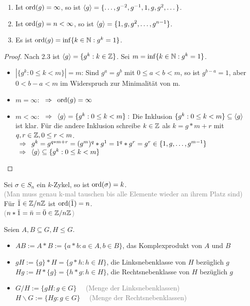\begin{satz}
	\begin{enumerate}
		\item Ist $\operatorname{ord}(g)= \infty$, so ist $\langle g \rangle = \{ \dots , g^{-2}, g^{-1}, 1, g, g^2, \dots \}$.
		\item Ist $\operatorname{ord}(g)=n < \infty$, so ist $\langle g \rangle=\{1,g,g^2, \dots , g^{n-1} \}$.
		\item Es ist $\operatorname{ord}(g) = \inf\{ k \in \mathbb{N} : g^k=1 \}$.
	\end{enumerate}
\end{satz}
\begin{proof}
	Nach 2.3 ist $\langle g \rangle= \{ g^k : k \in \mathbb{Z} \}$. Sei $m=\inf\{k \in \mathbb{N} : g^k = 1 \}$.
	\begin{itemize}
		\item $| \{ g^k : 0 \leq k < m \} | = m$: Sind $g^a=g^b$ mit $0 \leq a < b < m$, so ist $g^{b-a}=1$, aber $0 < b-a < m$ im Widerspruch zur Minimalität von m.
		\item $m=\infty$: $\enspace \Rightarrow \enspace \operatorname{ord}(g)=\infty \quad$ \checkmark
		\item $m<\infty$: $\enspace \Rightarrow \enspace \langle g \rangle = \{ g^k : 0 \leq k < m \}:$ Die Inklusion $\{ g^k :0 \leq k < m \} \subseteq \langle g \rangle$ ist klar. Für die andere Inklusion schreibe $k \in \mathbb{Z}$ als $k=g*m+r$ mit $q,r \in \mathbb{Z}, 0 \leq r < m$. \\ $\enspace \Rightarrow \enspace g^k =g^{q*m+r} = (g^m)^q*g^1 =1^q*g^r =g^r \in \{ 1,g,\dots,g^{m-1} \}$ \\
		$\enspace \Rightarrow \enspace \langle g \rangle \subseteq  \{ g^k : 0\leq k < m \}$
	\end{itemize}
\end{proof}

\begin{bsp}
	Sei $\sigma \in S_n$ ein $k$-Zykel, so ist $\operatorname{ord}(\sigma)=k$. \\ \textcolor{gray}{(Man muss genau k-mal tauschen bis alle Elemente wieder an ihrem Platz sind)} \\
	Für $\bar{1} \in \mathbb{Z} / n \mathbb{Z}$ ist $\operatorname{ord}(\bar{1})=n$. \\ \textcolor{gray}{($n*\bar{1}=\bar{n}=\bar{0} \in \mathbb{Z} / n \mathbb{Z}$)}
\end{bsp}

\begin{defin}
	Seien $A,B \subseteq G, H \leq G$.
	\begin{itemize}
		\item $AB := A*B := \{ a*b : a \in A, b \in B \}$, das Komplexprodukt von $A$ und $B$
		\item $gH := \{g\}*H = \{ g*h : h \in H\}$, die Linksnebenklasse von $H$ bezüglich $g$ \\
		$Hg := H * \{g\} = \{ h*g : h \in H\}$, die Rechtsnebenklasse von $H$ bezüglich $g$
		\item $G/H := \{ gH : g \in G \} \quad$ \textcolor{gray}{(Menge der Linksnebenklassen)} \\
		$H \backslash G := \{ Hg : g \in G \} \quad$ \textcolor{gray}{(Menge der Rechtsnebenklassen)} 
	\end{itemize}
\end{defin}

